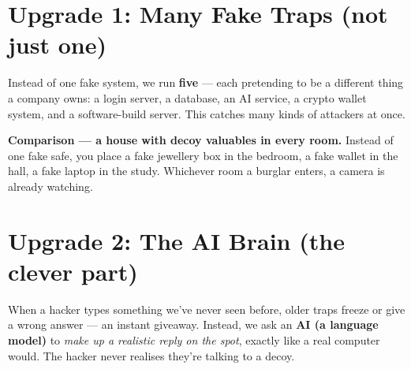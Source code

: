 \documentclass[11pt]{article}
\begin{document}
\vspace{4pt}
\begin{center}
\end{center}

\section*{\color{blue}Upgrade 1: Many Fake Traps (not just one)}

Instead of one fake system, we run \textbf{five} --- each pretending to be a
different thing a company owns: a login server, a database, an AI service, a
crypto wallet system, and a software-build server. This catches many kinds of
attackers at once.

\begin{analogy}
\textbf{Comparison --- a house with decoy valuables in every room.} Instead of
one fake safe, you place a fake jewellery box in the bedroom, a fake wallet in
the hall, a fake laptop in the study. Whichever room a burglar enters, a camera
is already watching.
\end{analogy}

\section*{\color{blue}Upgrade 2: The AI Brain (the clever part)}

When a hacker types something we've never seen before, older traps freeze or give
a wrong answer --- an instant giveaway. Instead, we ask an \textbf{AI (a language
model)} to \emph{make up a realistic reply on the spot}, exactly like a real
computer would. The hacker never realises they're talking to a decoy.
\end{document}
